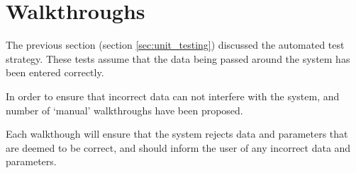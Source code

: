 \section{Walkthroughs}
\label{sec:walkthroughs}

The previous section (section \ref{sec:unit_testing}) discussed the automated 
test strategy. These tests assume that the data being passed around the system 
has been entered correctly.

In order to ensure that incorrect data can not interfere with the system, and 
number of `manual' walkthroughs have been proposed.

Each walkthough will ensure that the system rejects data and parameters that 
are deemed to be correct, and should inform the user of any incorrect data and 
parameters.

